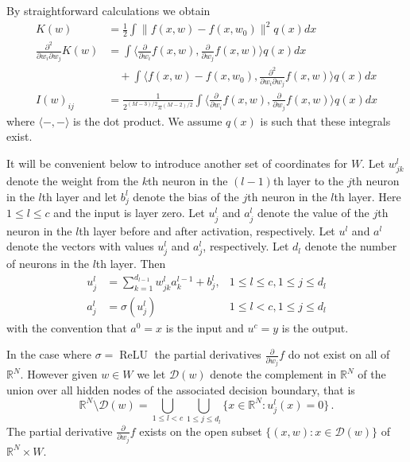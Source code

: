\documentclass{article} %
\begin{document}
By straightforward calculations we obtain
\begin{align}
K(w) &= \tfrac{1}{2} \int \| f(x,w) - f(x,w_0) \|^2 q(x) dx \label{eq:K_nn}\\
\tfrac{\partial^2}{\partial w_i \partial w_j} K(w) &= \int \Big\langle \tfrac{\partial}{\partial w_i} f(x,w), \tfrac{\partial}{\partial w_j} f(x,w) \Big\rangle q(x) dx \nonumber \\
&\quad + \int \Big\langle f(x,w) - f(x,w_0), \tfrac{\partial^2}{\partial w_i \partial w_j} f(x,w) \Big\rangle q(x) dx \label{eq:Hessian}\\
I(w)_{ij} &= \frac{1}{2^{(M-3)/2} \pi^{(M-2)/2}} \int \Big\langle \tfrac{\partial}{\partial w_i} f(x,w), \tfrac{\partial}{\partial w_j} f(x,w) \Big\rangle q(x) dx\label{eq:fisher_relu}
\end{align}
where $\langle -, - \rangle$ is the dot product. We assume $q(x)$ is such that these integrals exist.

It will be convenient below to introduce another set of coordinates for $W$. Let $w_{jk}^{l}$ denote the weight from the $k$th neuron in the $(l-1)$th layer to the $j$th neuron in the $l$th layer and let $b_j^{l}$ denote the bias of the $j$th neuron in the $l$th layer. Here $1 \le l \le c$ and the input is layer zero. Let $u_{j}^{l}$ and $a_{j}^{l}$ denote the value of the $j$th neuron in the $l$th layer before and after activation, respectively. Let $u^{l}$ and $a^{l}$ denote the vectors with values $u_{j}^{l}$ and $a_{j}^{l}$, respectively. Let $d_{l}$ denote the number of neurons in the $l$th layer. Then
\begin{align*}
	u_{j}^{l} &=\sum_{k=1}^{d_{l-1}}w_{jk}^{l}a_{k}^{l-1}+b_{j}^{l}, &1 \le l \le c, 1 \le j \le d_l\\
	a_{j}^{l} &=\sigma(u_{j}^{l}) & 1 \le l < c, 1 \le j \le d_l
\end{align*}
with the convention that $a^0 = x$ is the input and $u^c = y$ is the output.

In the case where $\sigma = \operatorname{ReLU}$ the partial derivatives $\frac{\partial}{\partial w_j} f$ do not exist on all of $\mathbb{R}^N$. However given $w \in W$ we let $\mathcal{D}(w)$ denote the complement in $\mathbb{R}^N$ of the union over all hidden nodes of the associated decision boundary, that is
\[
\mathbb{R}^N \setminus \mathcal{D}(w) = \bigcup_{1 \le l < c} \bigcup_{1 \le j \le d_l} \{ x \in \mathbb{R}^N : u^l_j(x) = 0 \}\,.
\]
The partial derivative $\frac{\partial}{\partial w_j} f$ exists on the open subset $\{ (x,w) : x \in \mathcal{D}(w) \}$ of $\mathbb{R}^N \times W$. 
\end{document}
